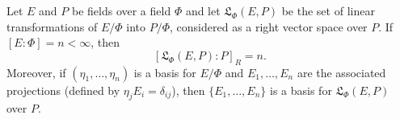 Let $E$ and $P$ be fields over a field $\Phi$ and let $\mathfrak{L}_\Phi(E, P)$ be the set of linear transformations of $E/\Phi$ into $P/\Phi$, considered as a right vector space over $P$. If $[E:\Phi] = n < \infty$, then
$$[\mathfrak{L}_\Phi(E, P) : P]_R = n.$$
Moreover, if $(\eta_1, \ldots, \eta_n)$ is a basis for $E/\Phi$ and $E_1, \ldots, E_n$ are the associated projections (defined by $\eta_j E_i = \delta_{ij}$), then $\{E_1, \ldots, E_n\}$ is a basis for $\mathfrak{L}_\Phi(E, P)$ over $P$.
